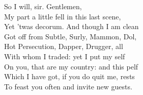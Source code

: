 \documentclass[a4paper,oneside,12pt]{memoir}
\begin{document}
\begin{drama*}
\facespeaks {} So I will, sir. Gentlemen,\\
My part a little fell in this last scene,\\
Yet 'twas decorum. And though I am clean\\
Got off from Subtle, Surly, Mammon, Dol,\\
Hot Persecution, Dapper, Drugger, all\\
With whom I traded: yet I put my self\\
On you, that are my country: and this pelf\\
Which I have got, if you do quit me, rests\\
To feast you often and invite new guests.\\

\end{drama*}
\end{document}
